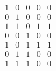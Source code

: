 \documentclass{article}
\begin{document}
\begin{enumerate}
{\begin{equation}
\begin{array}{c|c|c|c|c}
							  1 & 0 & 0 &        0        &           0           \\
							  0 & 1 & 0 &        0        &           0           \\
							  1 & 1 & 0 &        1        &           1           \\
							  0 & 0 & 1 &        0        &           0           \\
							  1 & 0 & 1 &        1        &           1           \\
							  0 & 1 & 1 &        0        &           0           \\
							  1 & 1 & 1 &        0        &           0           \\
							  \end{array}\end{equation}}
\end{enumerate}
\end{document}
